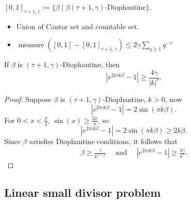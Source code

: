 \documentclass[]{beamer}
\newcommand{\be}{\beta}
\newcommand{\g}{\gamma}
\begin{document}
\begin{frame}
            $[0,1]_{\tau+1, \g} := \{ \be \mid \be (\tau + 1, \g)$-Diophantine$\}$.
\begin{itemize}
    \item Union of Cantor set and countable set.
    \item $\operatorname{measure}([0,1]-[0,1]_{\tau+1, \g}) \le 2 \g \displaystyle \sum_{q \ge 1} q^{-\tau}$
\end{itemize}
\pause
    \begin{theorem}
        If $\be$ is $(\tau + 1, \g)$-Diophantine, then
        \begin{equation*}
            \left| e^{2 \pi i k \be} - 1 \right| \ge \frac{4 \g}{|k|^\tau}.
        \end{equation*}
    \end{theorem}
\end{frame}

\begin{frame}
    \begin{proof}
        Suppose $\be$ is $(\tau + 1, \g)$-Diophantine, $k > 0$, now
        \begin{equation*}
            |e^{2\pi i k \beta}  - 1| = 2 \sin (\pi k \beta).
        \end{equation*}
        For $0 < x < \frac{\pi}{2}$, $\sin(x) \ge \frac{2 x}{\pi}$, so
        \begin{equation*}
            |e^{2\pi i k \beta}  - 1| = 2 \sin (\pi k \be) \ge 2 k \be.
        \end{equation*}
        Since $\be$ satisfies Diophantine conditions, it follows that
        \begin{align*}
            \be \ge \frac{\gamma}{k^{\tau + 1}} \quad \text{ and } \quad
            |e^{2\pi i k \beta}  - 1| \ge \frac{4 \g}{k^\tau}.
        \end{align*}
    \end{proof}
\end{frame}

\subsection{Linear small divisor problem}
\end{document}
